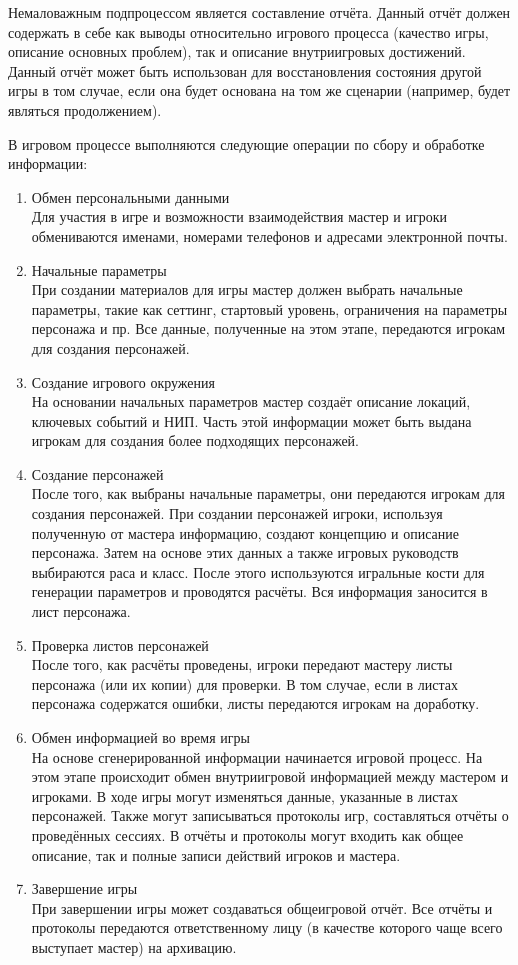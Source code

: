 \begin{enumerate}
Немаловажным подпроцессом является составление отчёта. Данный отчёт должен содержать в себе как выводы относительно игрового процесса (качество игры, описание основных проблем), так и описание внутриигровых достижений. Данный отчёт может быть использован для восстановления состояния другой игры в том случае, если она будет основана на том же сценарии (например, будет являться продолжением).
\end{enumerate}


В игровом процессе выполняются следующие операции по сбору и обработке информации:
\begin{enumerate}
\item Обмен персональными данными\\
Для участия в игре и возможности взаимодействия мастер и игроки обмениваются именами, номерами телефонов и адресами электронной почты.
\item Начальные параметры\\
При создании материалов для игры мастер должен выбрать начальные параметры, такие как сеттинг, стартовый уровень, ограничения на параметры персонажа и пр. Все данные, полученные на этом этапе, передаются игрокам для создания персонажей.
\item Создание игрового окружения\\
На основании начальных параметров мастер создаёт описание локаций, ключевых событий и НИП. Часть этой информации может быть выдана игрокам для создания более подходящих персонажей.
\item Создание персонажей\\
После того, как выбраны начальные параметры, они передаются игрокам для создания персонажей. При создании персонажей игроки, используя полученную от мастера информацию, создают концепцию и описание персонажа. Затем на основе этих данных а также игровых руководств выбираются раса и класс. После этого используются игральные кости для генерации параметров и проводятся расчёты. Вся информация заносится в лист персонажа.
\item Проверка листов персонажей\\
После того, как расчёты проведены, игроки передают мастеру листы персонажа (или их копии) для проверки. В том случае, если в листах персонажа содержатся ошибки, листы передаются игрокам на доработку.
\item Обмен информацией во время игры\\
На основе сгенерированной информации начинается игровой процесс. На этом этапе происходит обмен внутриигровой информацией между мастером и игроками. В ходе игры могут изменяться данные, указанные в листах персонажей. Также могут записываться протоколы игр, составляться отчёты о проведённых сессиях. В отчёты и протоколы могут входить как общее описание, так и полные записи действий игроков и мастера.
\item Завершение игры\\
При завершении игры может создаваться общеигровой отчёт. Все отчёты и протоколы передаются ответственному лицу (в качестве которого чаще всего выступает мастер) на архивацию.
\end{enumerate}
